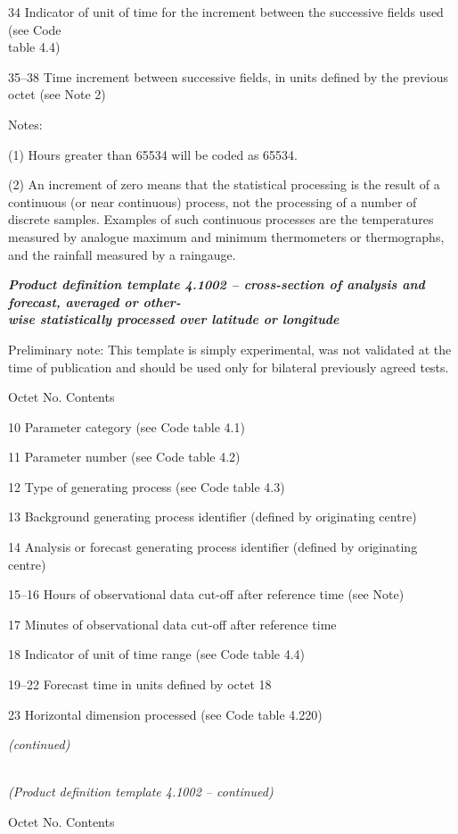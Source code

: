 34 Indicator of unit of time for the increment between the successive fields used (see Code\\
table 4.4)

35--38 Time increment between successive fields, in units defined by the previous octet (see Note 2)

Notes:

(1) Hours greater than 65534 will be coded as 65534.

(2) An increment of zero means that the statistical processing is the result of a continuous (or near continuous) process, not the processing of a number of discrete samples. Examples of such continuous processes are the temperatures measured by analogue maximum and minimum thermometers or thermographs, and the rainfall measured by a raingauge.

\emph{\textbf{Product definition template 4.1002 -- cross-section of analysis and forecast, averaged or other-\\
wise statistically processed over latitude or longitude}}

Preliminary note: This template is simply experimental, was not validated at the time of publication and should be used only for bilateral previously agreed tests.

Octet No. Contents

10 Parameter category (see Code table 4.1)

11 Parameter number (see Code table 4.2)

12 Type of generating process (see Code table 4.3)

13 Background generating process identifier (defined by originating centre)

14 Analysis or forecast generating process identifier (defined by originating centre)

15--16 Hours of observational data cut-off after reference time (see Note)

17 Minutes of observational data cut-off after reference time

18 Indicator of unit of time range (see Code table 4.4)

19--22 Forecast time in units defined by octet 18

23 Horizontal dimension processed (see Code table 4.220)

\emph{(continued)}

\emph{\\
(Product definition template 4.1002 -- continued)}

Octet No. Contents

